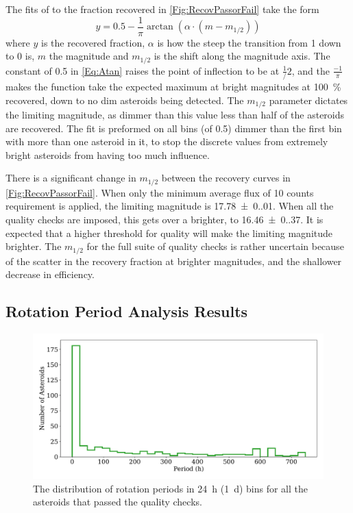 \documentclass{UCreport}
\begin{document}
The fits of to the fraction recovered in \autoref{Fig:RecovPassorFail} take the form
\begin{equation} \label{Eq:Atan}
  y= 0.5 -\frac{1}{\pi} \arctan(\alpha \cdot (m-m_{1/2}))
\end{equation}
where $y$ is the recovered fraction, $\alpha$ is how the steep the transition from 1 down to 0 is,  $m$ the magnitude and $m_{1/2}$ is the shift along the magnitude axis.
The constant of 0.5 in \autoref{Eq:Atan} raises the point of inflection to be at $\frac 1/2$, and the $\frac{-1}{\pi}$ makes the function take the expected maximum at bright magnitudes at \qty{100}{\percent} recovered, down to no dim asteroids being detected.
The $m_{1/2}$ parameter dictates the limiting magnitude, as dimmer than this value less than half of the asteroids are recovered.
The fit is preformed on all bins (of \qty{0.5}{\mag}) dimmer than the first bin with more than one asteroid in it, to stop the discrete values from extremely bright asteroids from having too much influence.

There is a significant change in $m_{1/2}$ between the recovery curves in \autoref{Fig:RecovPassorFail}.
When only the minimum average flux of 10 counts requirement is applied, the limiting magnitude is \qty{17.78(0.01)}{\mag}.
When all the quality checks are imposed, this gets over a \unit{\mag} brighter, to \qty{16.46(0.37)}{\mag}.
It is expected that a higher threshold for quality will make the limiting magnitude brighter.
The $m_{1/2}$ for the full suite of quality checks is rather  uncertain because of the scatter in the recovery fraction at brighter magnitudes, and the shallower decrease in efficiency.


\subsection{Rotation Period Analysis Results}\label{SubSec:PerRes}


\begin{figure}[h]
  \centering
  \includegraphics[width=\textwidth]{./Figures/perDistr.pdf}
  \caption[Period Distribution]{The distribution of rotation periods in \qty{24}{\hour} (\qty{1}{\day}) bins for all the asteroids that passed the quality checks.}
  \label{Fig:PerDistr}
\end{figure}
\end{document}
